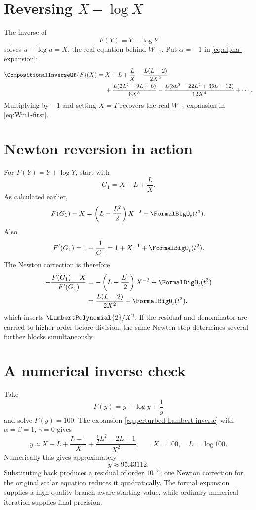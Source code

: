 \documentclass[11pt,openany]{book}
\theoremstyle{definition}
\theoremstyle{plain}
\theoremstyle{remark}
\newcommand{\rev}[1]{\CompositionalInverseOf{#1}}
\begin{document}
\section{Reversing \texorpdfstring{\(X-\log X\)}{X-log X}}
The inverse of
\[
 F(Y)=Y-\log Y
\]
solves \(u-\log u=X\), the real equation behind \(W_{-1}\).  Put
\(\alpha=-1\) in \cref{eq:alpha-expansion}:
\begin{equation}\label{eq:inverse-X-minus-logX}
\begin{split}
 \rev F(X)={}&X+L+\frac{L}{X}
 -\frac{L(L-2)}{2X^2}\\
 &+\frac{L(2L^2-9L+6)}{6X^3}
 -\frac{L(3L^3-22L^2+36L-12)}{12X^4}+\cdots.
\end{split}
\end{equation}
Multiplying by \(-1\) and setting \(X=T\) recovers the real
\(W_{-1}\) expansion in \cref{eq:Wm1-first}.

\section{Newton reversion in action}
For \(F(Y)=Y+\log Y\), start with
\[
 G_1=X-L+\frac{L}{X}.
\]
As calculated earlier,
\[
 F(G_1)-X=\left(L-\frac{L^2}{2}\right)X^{-2}+\FormalBigO_t(t^3).
\]
Also
\[
 F'(G_1)=1+\frac1{G_1}=1+X^{-1}+\FormalBigO_t(t^2).
\]
The Newton correction is therefore
\begin{align*}
 -\frac{F(G_1)-X}{F'(G_1)}
 &=-\left(L-\frac{L^2}{2}\right)X^{-2}+\FormalBigO_t(t^3)\\
 &=\frac{L(L-2)}{2X^2}+\FormalBigO_t(t^3),
\end{align*}
which inserts \(\LambertPolynomial{2}/X^2\).  If the residual and denominator are carried to
higher order before division, the same Newton step determines several further
blocks simultaneously.

\section{A numerical inverse check}
Take
\[
 F(y)=y+\log y+\frac{1}{y}
\]
and solve \(F(y)=100\).  The expansion
\cref{eq:perturbed-Lambert-inverse} with \(\alpha=\beta=1\), \(\gamma=0\)
gives
\[
 y\approx X-L+\frac{L-1}{X}
 +\frac{\tfrac12L^2-2L+1}{X^2},
 \qquad X=100,
 \quad L=\log100.
\]
Numerically this gives approximately
\[
 y\approx95.43112.
\]
Substituting back produces a residual of order \(10^{-5}\); one Newton
correction for the original scalar equation reduces it quadratically.  The
formal expansion supplies a high-quality branch-aware starting value, while
ordinary numerical iteration supplies final precision.
\end{document}
